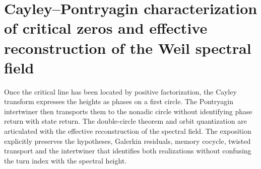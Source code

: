 \chapter{Cayley–Pontryagin characterization of critical zeros and effective reconstruction of the Weil spectral field}
\label{chap:hmt83-doble-circulo-campo-espectral}

Once the critical line has been located by positive factorization, the Cayley transform expresses the heights as phases on a first circle. The Pontryagin intertwiner then transports them to the nonadic circle without identifying phase return with state return. The double-circle theorem and orbit quantization are articulated with the effective reconstruction of the spectral field. The exposition explicitly preserves the hypotheses, Galerkin residuals, memory cocycle, twisted transport and the intertwiner that identifies both realizations without confusing the turn index with the spectral height.


